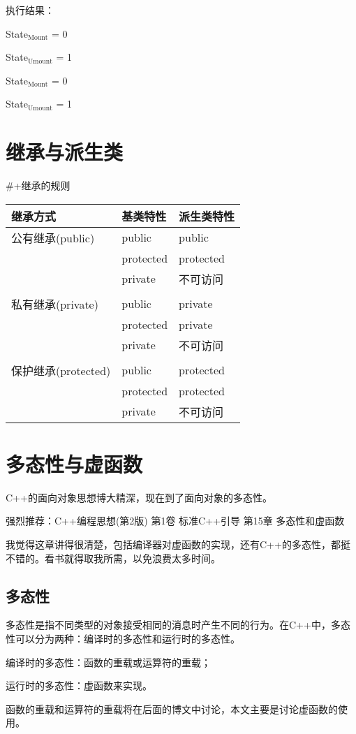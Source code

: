 \documentclass{article}
\begin{document}
执行结果：

State$_{\text{Mount}}$  = 0

State$_{\text{Umount}}$ = 1

State$_{\text{Mount}}$  = 0

State$_{\text{Umount}}$ = 1
\section{继承与派生类}
\label{sec-7}
\#+继承的规则 
\begin{center}
\begin{tabular}{lll}
继承方式 & 基类特性 & 派生类特性\\
\hline
公有继承(public) & public & public\\
 & protected & protected\\
 & private & 不可访问\\
\\
私有继承(private) & public & private\\
 & protected & private\\
 & private & 不可访问\\
\\
保护继承(protected) & public & protected\\
 & protected & protected\\
 & private & 不可访问\\
\end{tabular}
\end{center}
\section{多态性与虚函数}
\label{sec-8}
C++的面向对象思想博大精深，现在到了面向对象的多态性。

强烈推荐：C++编程思想(第2版) 第1卷 标准C++引导 第15章 多态性和虚函数 

我觉得这章讲得很清楚，包括编译器对虚函数的实现，还有C++的多态性，都挺不错的。看书就得取我所需，以免浪费太多时间。

\subsection{多态性}
\label{sec-8-1}
多态性是指不同类型的对象接受相同的消息时产生不同的行为。在C++中，多态性可以分为两种：编译时的多态性和运行时的多态性。

编译时的多态性：函数的重载或运算符的重载；

运行时的多态性：虚函数来实现。

函数的重载和运算符的重载将在后面的博文中讨论，本文主要是讨论虚函数的使用。
\end{document}
